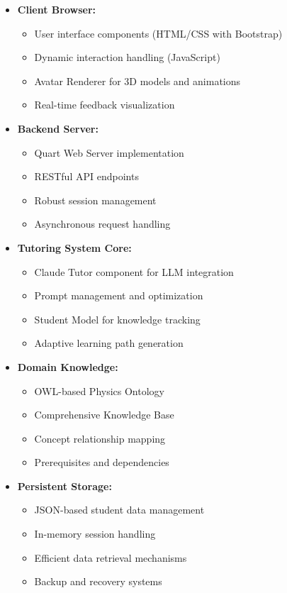 \begin{itemize}
    \item \textbf{Client Browser:} 
        \begin{itemize}
            \item User interface components (HTML/CSS with Bootstrap)
            \item Dynamic interaction handling (JavaScript)
            \item Avatar Renderer for 3D models and animations
            \item Real-time feedback visualization
        \end{itemize}
    
    \item \textbf{Backend Server:} 
        \begin{itemize}
            \item Quart Web Server implementation
            \item RESTful API endpoints
            \item Robust session management
            \item Asynchronous request handling
        \end{itemize}
    
    \item \textbf{Tutoring System Core:} 
        \begin{itemize}
            \item Claude Tutor component for LLM integration
            \item Prompt management and optimization
            \item Student Model for knowledge tracking
            \item Adaptive learning path generation
        \end{itemize}
    
    \item \textbf{Domain Knowledge:} 
        \begin{itemize}
            \item OWL-based Physics Ontology
            \item Comprehensive Knowledge Base
            \item Concept relationship mapping
            \item Prerequisites and dependencies
        \end{itemize}
    
    \item \textbf{Persistent Storage:} 
        \begin{itemize}
            \item JSON-based student data management
            \item In-memory session handling
            \item Efficient data retrieval mechanisms
            \item Backup and recovery systems
        \end{itemize}
\end{itemize}

